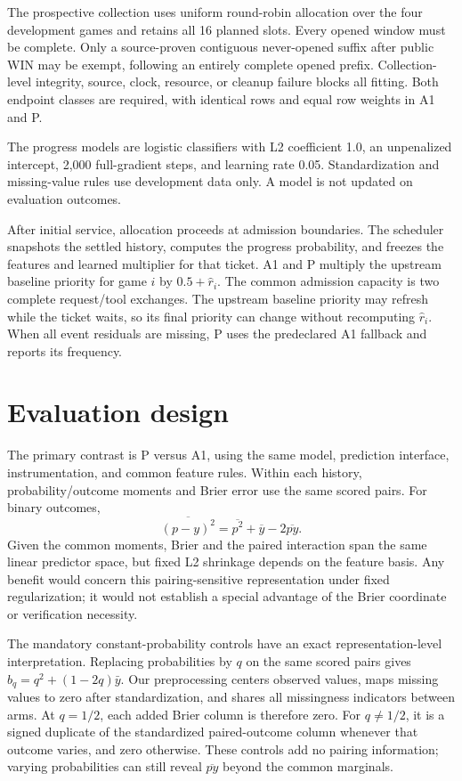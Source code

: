 \documentclass[11pt]{article}
\begin{document}
The prospective collection uses uniform round-robin allocation over the four development games and retains all 16 planned slots. Every opened window must be complete. Only a source-proven contiguous never-opened suffix after public WIN may be exempt, following an entirely complete opened prefix. Collection-level integrity, source, clock, resource, or cleanup failure blocks all fitting. Both endpoint classes are required, with identical rows and equal row weights in A1 and P.

The progress models are logistic classifiers with L2 coefficient 1.0, an unpenalized intercept, 2,000 full-gradient steps, and learning rate 0.05. Standardization and missing-value rules use development data only. A model is not updated on evaluation outcomes.

After initial service, allocation proceeds at admission boundaries. The scheduler snapshots the settled history, computes the progress probability, and freezes the features and learned multiplier for that ticket. A1 and P multiply the upstream baseline priority for game $i$ by $0.5+\hat r_i$. The common admission capacity is two complete request/tool exchanges. The upstream baseline priority may refresh while the ticket waits, so its final priority can change without recomputing $\hat r_i$. When all event residuals are missing, P uses the predeclared A1 fallback and reports its frequency.

\section{Evaluation design}
The primary contrast is P versus A1, using the same model, prediction interface, instrumentation, and common feature rules. Within each history, probability/outcome moments and Brier error use the same scored pairs. For binary outcomes,
\[
\overline{(p-y)^2}=\overline{p^2}+\overline{y}-2\overline{py}.
\]
Given the common moments, Brier and the paired interaction span the same linear predictor space, but fixed L2 shrinkage depends on the feature basis. Any benefit would concern this pairing-sensitive representation under fixed regularization; it would not establish a special advantage of the Brier coordinate or verification necessity.

The mandatory constant-probability controls have an exact representation-level interpretation. Replacing probabilities by $q$ on the same scored pairs gives $b_q=q^2+(1-2q)\bar y$. Our preprocessing centers observed values, maps missing values to zero after standardization, and shares all missingness indicators between arms. At $q=1/2$, each added Brier column is therefore zero. For $q\ne1/2$, it is a signed duplicate of the standardized paired-outcome column whenever that outcome varies, and zero otherwise. These controls add no pairing information; varying probabilities can still reveal $\overline{py}$ beyond the common marginals.
\end{document}
